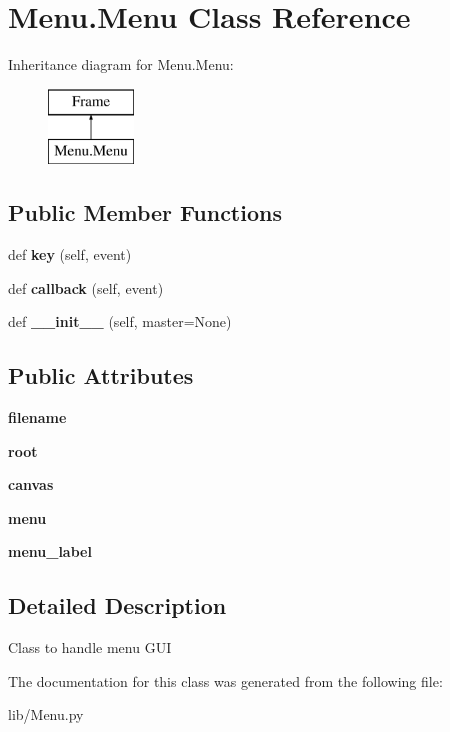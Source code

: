 \section{Menu.\+Menu Class Reference}
\label{class_menu_1_1_menu}
Inheritance diagram for Menu.\+Menu\+:\begin{figure}[H]
\begin{center}
\leavevmode
\includegraphics[height=2.000000cm]{class_menu_1_1_menu}
\end{center}
\end{figure}
\subsection*{Public Member Functions}
\begin{DoxyCompactItemize}
\item 
\mbox{\label{class_menu_1_1_menu_a192785b95591dc7bdc5faf0d2bb56d27}} 
def {\bfseries key} (self, event)
\item 
\mbox{\label{class_menu_1_1_menu_a6dd74d36fda2d88998fba863f029bfe1}} 
def {\bfseries callback} (self, event)
\item 
\mbox{\label{class_menu_1_1_menu_a06cf9e4a3865a0fdbf5a04ea44b6c13b}} 
def {\bfseries \+\_\+\+\_\+init\+\_\+\+\_\+} (self, master=None)
\end{DoxyCompactItemize}
\subsection*{Public Attributes}
\begin{DoxyCompactItemize}
\item 
\mbox{\label{class_menu_1_1_menu_a1e517ddc55633da361d27e455422ffbc}} 
{\bfseries filename}
\item 
\mbox{\label{class_menu_1_1_menu_a4cd78a3815634c8b6702d188c8c0f538}} 
{\bfseries root}
\item 
\mbox{\label{class_menu_1_1_menu_abc5dc4ee892cf12184228f2e138a3d6b}} 
{\bfseries canvas}
\item 
\mbox{\label{class_menu_1_1_menu_abaaf9d372dbc077c24ba14d061bc01f1}} 
{\bfseries menu}
\item 
\mbox{\label{class_menu_1_1_menu_a7e768c5029f17d0fa48bbdac18f524d2}} 
{\bfseries menu\+\_\+label}
\end{DoxyCompactItemize}


\subsection{Detailed Description}
\begin{DoxyVerb}Class to handle menu GUI
\end{DoxyVerb}
 

The documentation for this class was generated from the following file\+:\begin{DoxyCompactItemize}
\item 
lib/Menu.\+py\end{DoxyCompactItemize}
